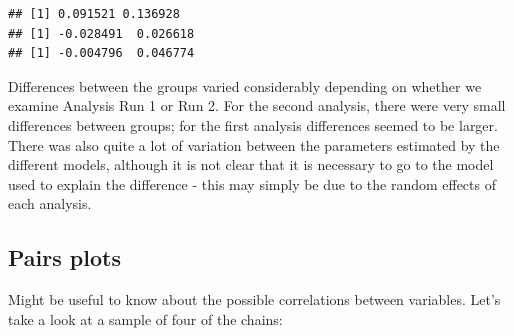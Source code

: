 \documentclass[]{article}
\begin{document}
\begin{verbatim}
## [1] 0.091521 0.136928
## [1] -0.028491  0.026618
## [1] -0.004796  0.046774
\end{verbatim}

Differences between the groups varied considerably depending on whether
we examine Analysis Run 1 or Run 2. For the second analysis, there were
very small differences between groups; for the first analysis
differences seemed to be larger. There was also quite a lot of variation
between the parameters estimated by the different models, although it is
not clear that it is necessary to go to the model used to explain the
difference - this may simply be due to the random effects of each
analysis.

\subsection{Pairs plots}\label{pairs-plots}

Might be useful to know about the possible correlations between
variables. Let's take a look at a sample of four of the chains:
\end{document}
